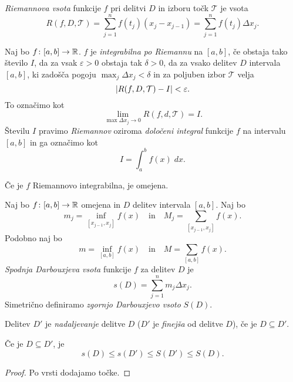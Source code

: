 \documentclass[12pt, a4paper]{article}
\begin{document}
\begin{definicija}
\emph{Riemannova vsota} funkcije $f$ pri delitvi $D$ in izboru točk $\mathcal{T}$ je vsota
\[
R(f,D,\mathcal{T})=\sum_{j=1}^n f(t_j)(x_j-x_{j-1})=\sum_{j=1}^n f(t_j)\Delta x_j.
\]
\end{definicija}

\begin{okvir}
\begin{definicija}
Naj bo $f\colon[a,b]\to\mathbb{R}$. $f$ je \emph{integrabilna po Riemannu} na $[a,b]$, če obstaja tako število $I$, da za vsak $\varepsilon>0$ obstaja tak $\delta>0$, da za vsako delitev $D$ intervala $[a,b]$, ki zadošča pogoju $\displaystyle\max_{j}\Delta x_j<\delta$ in za poljuben izbor $\mathcal{T}$ velja
\[
\left\lvert R(f,D,\mathcal{T})-I\right\rvert<\varepsilon.
\]
To označimo kot
\[
\lim_{\max \Delta x_j\to 0} R(f,d,\mathcal{T})=I.
\]
Številu $I$ pravimo \emph{Riemannov} oziroma \emph{določeni integral} funkcije $f$ na intervalu $[a,b]$ in ga označimo kot
\[
I=\int_a^b f(x)\;dx.
\]
\end{definicija}
\end{okvir}

\begin{opomba}
Če je $f$ Riemannovo integrabilna, je omejena.
\end{opomba}

\begin{definicija}
Naj bo $f\colon[a,b]\to\mathbb{R}$ omejena in $D$ delitev intervala $[a,b]$. Naj bo 
\[
m_j=\inf_{[x_{j-1},x_j]} f(x)\quad\text{in}\quad M_j=\sum_{[x_{j-1},x_j]} f(x).
\]
Podobno naj bo
\[
m=\inf_{[a,b]} f(x)\quad\text{in}\quad M=\sum_{[a,b]} f(x).
\]
\emph{Spodnja Darbouxjeva vsota} funkcije $f$ za delitev $D$ je
\[
s(D)=\sum_{j=1}^n m_j\Delta x_j.
\]
Simetrično definiramo \emph{zgornjo Darbouxjevo vsoto} $S(D)$.
\end{definicija}

\begin{definicija}
Delitev $D'$ je \emph{nadaljevanje} delitve $D$ ($D'$ je \emph{finejša} od delitve $D$), če je $D\subseteq D'$.
\end{definicija}

\begin{trditev}
Če je $D\subseteq D'$, je
\[
s(D)\leq s(D')\leq S(D')\leq S(D).
\]
\end{trditev}

\begin{proof}
Po vrsti dodajamo točke.
\end{proof}
\end{document}
